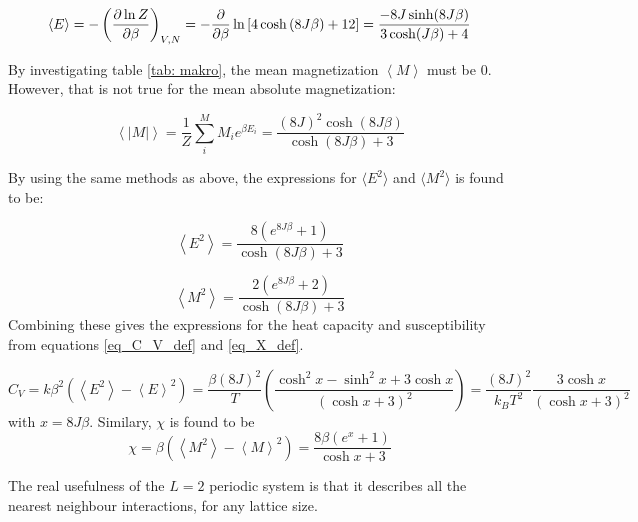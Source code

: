 \[ 	\langle E \rangle = - \left(\pdv{\ln Z}{\beta}\right)_{V,N} = 	 - \frac{\partial}{\partial \beta} \ln \left[ 4 \cosh \left( 8J\beta\right)+12\right] =\frac{-8J \sinh(8J\beta)}{3\cosh(J\beta)+ 4} \]  

By investigating table \ref{tab: makro}, the mean magnetization 
$
\left< M \right> $ must be $0$. However, that is not true for the mean absolute magnetization:

\[
\left< |M| \right> = \frac{1}{Z} \sum_i^M M_i e^{\beta E_i}  = \frac{(8J)^2 \cosh(8J\beta )}{\cosh (8J\beta ) + 3}
\]

By using the same methods as above, the expressions for $ \langle E^2 \rangle  $ and  $ \langle M^2 \rangle  $ is found to be:

\[
\left< E^2 \right> = \frac{8 \left( e^{8J\beta } + 1\right) }{\cosh (8J\beta ) + 3}
\]


\[
\left< M^2 \right>  = \frac{2 \left( e^{8J\beta } + 2\right) }{\cosh (8J\beta ) + 3}
\]
Combining these gives the expressions for the heat capacity and susceptibility from equations \ref{eq_C_V_def} and \ref{eq_X_def}.

\[
C_V = k \beta^2\left( \left< E^2\right> - \left< E\right>^2 \right) = \frac{\beta (8J)^2}{T} \left( \frac{\cosh^2x -\sinh^2 x + 3 \cosh x}{(\cosh x + 3)^2}\right) = \frac{ (8J)^2}{k_BT^2}  \frac{ 3 \cosh x}{(\cosh x + 3)^2}
\]
with $ x = 8J\beta $. Similary, $ \chi $ is found to be
\[
\chi = \beta \left( \left< M^2\right> - \left< M\right>^2\right) = \frac{8\beta \left( e^{x} +1\right)}{\cosh x +3}
\]

The real usefulness of the $ L=2 $ periodic system is that it describes all the nearest neighbour interactions, for any lattice size. 

